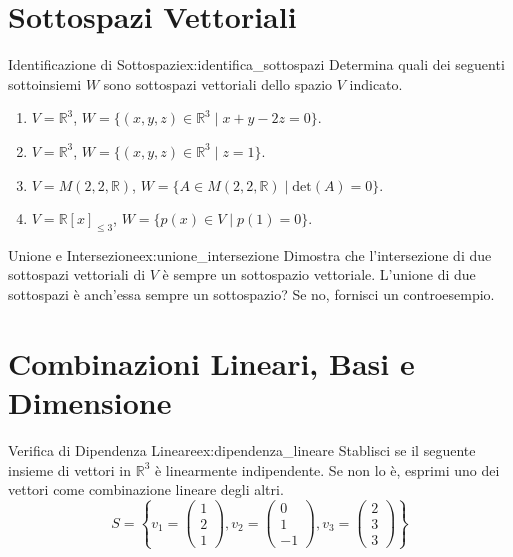 \documentclass{article}
\begin{document}
\section{Sottospazi Vettoriali}

\begin{exercise}{Identificazione di Sottospazi}{ex:identifica_sottospazi}
    Determina quali dei seguenti sottoinsiemi $W$ sono sottospazi vettoriali dello spazio $V$ indicato.
    \begin{enumerate}
        \item $V = \mathbb{R}^3$, $W = \{ (x, y, z) \in \mathbb{R}^3 \mid x + y - 2z = 0 \}$.
        \item $V = \mathbb{R}^3$, $W = \{ (x, y, z) \in \mathbb{R}^3 \mid z = 1 \}$.
        \item $V = M(2, 2, \mathbb{R})$, $W = \{ A \in M(2, 2, \mathbb{R}) \mid \text{det}(A) = 0 \}$.
        \item $V = \mathbb{R}[x]_{\le 3}$, $W = \{ p(x) \in V \mid p(1) = 0 \}$.
    \end{enumerate}
\end{exercise}

\begin{exercise}{Unione e Intersezione}{ex:unione_intersezione}
    Dimostra che l'intersezione di due sottospazi vettoriali di $V$ è sempre un sottospazio vettoriale. L'unione di due sottospazi è anch'essa sempre un sottospazio? Se no, fornisci un controesempio.
\end{exercise}

\section{Combinazioni Lineari, Basi e Dimensione}

\begin{exercise}{Verifica di Dipendenza Lineare}{ex:dipendenza_lineare}
    Stablisci se il seguente insieme di vettori in $\mathbb{R}^3$ è linearmente indipendente. Se non lo è, esprimi uno dei vettori come combinazione lineare degli altri.
    \[ S = \left\{ v_1 = \begin{pmatrix} 1 \\ 2 \\ 1 \end{pmatrix}, v_2 = \begin{pmatrix} 0 \\ 1 \\ -1 \end{pmatrix}, v_3 = \begin{pmatrix} 2 \\ 3 \\ 3 \end{pmatrix} \right\} \]
\end{exercise}
\end{document}
